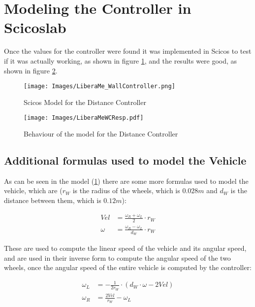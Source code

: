 \section{Modeling the Controller in Scicoslab}

  Once the values for the controller were found it was implemented in
  Scicos to test if it was actually working, as shown in figure
  \ref{img:LiberaMeWCMod}, and the results were good, as shown in figure
  \ref{img:LiberaMeWCResp}.   

  \begin{figure}[h!]
    \centering
    \texttt{[image: Images/LiberaMe\_WallController.png]}
    \caption{Scicos Model for the Distance Controller
    \label{img:LiberaMeWCMod}}
  \end{figure}

  \begin{figure}[h!]
    \centering
    \texttt{[image: Images/LiberaMeWCResp.pdf]}
    \caption{Behaviour of the model for the Distance Controller
    \label{img:LiberaMeWCResp}}
  \end{figure}

  \subsection{Additional formulas used to model the Vehicle}

    As can be seen in the model (\ref{img:LiberaMeWCMod}) there are some
    more formulas used to model the vehicle, which are ($r_W$ is the radius
    of the wheels, which is $0.028 m$ and $d_W$ is the distance between
    them, which is $0.12 m$):

    \begin{align}
      Vel &= \frac{\omega_R + \omega_L}{2} \cdot r_W \\
      \omega &= \frac{\omega_R - \omega_L}{d_W} \cdot r_W
    \end{align}

    These are used to compute the linear speed of the vehicle and its
    angular speed, and are used in their inverse form to compute the
    angular speed of the two wheels, once the angular speed of the entire
    vehicle is computed by the controller:

    \begin{align}
      \omega_L &= -\frac{1}{2 r_W} \cdot \left( d_W \cdot \omega - 2Vel
      \right) \\
      \omega_R &= \frac{2Vel}{r_W} - \omega_L
    \end{align}

